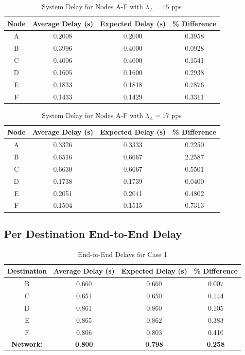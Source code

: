 \documentclass{article}
\begin{document}
\begin{appendices}
\begin{table}[h!]
\centering
\begin{tabular}{|c|c|c|c|} \hline
\textbf{Node} & \textbf{Average Delay (s)} & \textbf{Expected Delay (s)} & \textbf{\% Difference} \\ \hline
A & 0.2008 & 0.2000 & 0.3958 \\ \hline
B & 0.3996 & 0.4000 & 0.0928 \\ \hline
C & 0.4006 & 0.4000 & 0.1541 \\ \hline
D & 0.1605 & 0.1600 & 0.2938 \\ \hline
E & 0.1833 & 0.1818 & 0.7876 \\ \hline
F & 0.1433 & 0.1429 & 0.3311 \\ \hline
\end{tabular}
\caption{System Delay for Nodes A-F with $\lambda_A = 15$ pps}
\label{tab:simNodeTimeA}
\end{table}

\begin{table}[h!]
\centering
\begin{tabular}{|c|c|c|c|} \hline
\textbf{Node} & \textbf{Average Delay (s)} & \textbf{Expected Delay (s)} & \textbf{\% Difference} \\ \hline
A & 0.3326 & 0.3333 & 0.2250 \\ \hline
B & 0.6516 & 0.6667 & 2.2587 \\ \hline
C & 0.6630 & 0.6667 & 0.5501 \\ \hline
D & 0.1738 & 0.1739 & 0.0400 \\ \hline
E & 0.2051 & 0.2041 & 0.4802 \\ \hline
F & 0.1504 & 0.1515 & 0.7313 \\ \hline
\end{tabular}
\caption{System Delay for Nodes A-F with $\lambda_A = 17$ pps}
\label{tab:simNodeTimeB}
\end{table}

\subsection*{Per Destination End-to-End Delay}
\begin{table}[h!]
\centering
\begin{tabular}{|c|c|c|c|} \hline
\textbf{Destination} & \textbf{Average Delay (s)} & \textbf{Expected Delay (s)} & \textbf{\% Difference} \\ \hline
B & 0.660 & 0.660 & 0.007 \\ \hline
C & 0.651 & 0.650 & 0.144 \\ \hline
D & 0.861 & 0.860 & 0.105 \\ \hline
E & 0.865 & 0.862 & 0.383 \\ \hline
F & 0.806 & 0.803 & 0.410 \\ \hline
\textbf{Network:} & \textbf{0.800} & \textbf{0.798} & \textbf{0.258} \\ \hline
\end{tabular}
\caption{End-to-End Delays for Case 1}
\label{tab:nodeDelayA}
\end{table}


\end{appendices}
\end{document}
